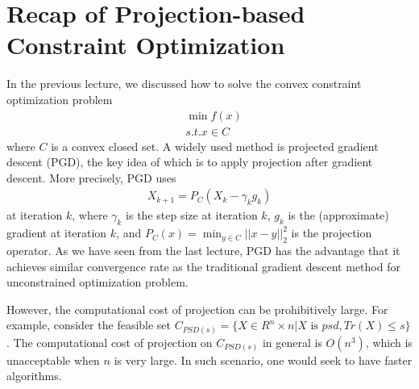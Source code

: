 \documentclass[12pt]{report}
\begin{document}

\maketitle

\vspace*{.1in}



\section{Recap of Projection-based Constraint Optimization}
In the previous lecture, we discussed how to solve the convex constraint optimization problem
\begin{equation}
\begin{split}
& \min f(x)\\
& s.t. x\in C
\end{split}
\end{equation}
where $C$ is a convex closed set. A widely used method is projected gradient descent (PGD), the key idea of which is to apply projection after gradient descent. More precisely, PGD uses
\begin{equation}
\begin{split}
 X_{k+1} = P_{C}(X_k - \gamma_k g_k)
\end{split}
\end{equation}
at iteration $k$, where $\gamma_k$ is the step size at iteration $k$, $g_k$ is the (approximate) gradient at iteration $k$, and $P_C(x) = \min_{y\in C}{||x-y||_2^2} $ is the projection operator. As we have seen from the last lecture, PGD has the advantage that it achieves similar convergence rate as the traditional gradient descent method for unconstrained optimization problem. 

However, the computational cost of projection can be prohibitively large. For example, consider the feasible set $C_{PSD(s)} = \{ X \in R^n\times n| X \textrm{ is }  psd, Tr(X) \leq s \}$. The computational cost of projection on $C_{PSD(s)}$ in general is $O(n^3)$, which is unacceptable when $n$ is very large. In such scenario, one would seek to have faster algorithms.   
\end{document}
